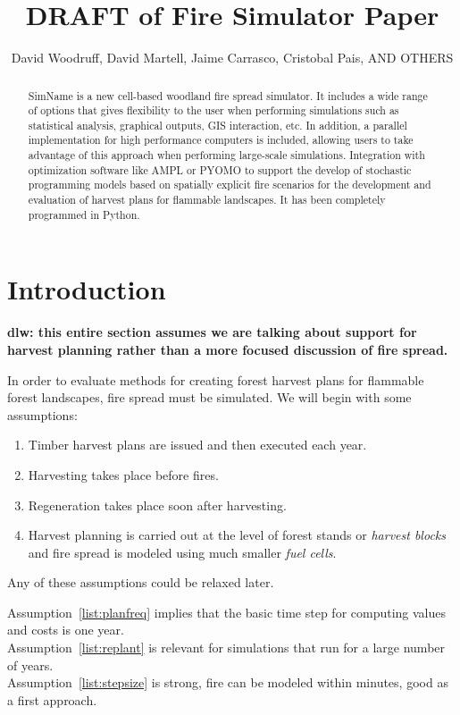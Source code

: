\documentclass[11pt]{article}
\title{DRAFT of Fire Simulator Paper}
\author{David Woodruff, David Martell, Jaime Carrasco, Cristobal Pais, AND OTHERS}
\begin{document}
\maketitle

\begin{abstract}
  SimName is a new cell-based woodland fire spread simulator. It includes a wide range of options that gives flexibility to the user when performing simulations such as statistical analysis, graphical outputs, GIS interaction, etc. In addition, a parallel implementation for high performance computers is included, allowing users to take advantage of this approach when performing large-scale simulations. Integration with optimization software like AMPL or PYOMO to support the develop
  of stochastic programming models based on spatially explicit
  fire scenarios for the development and evaluation of harvest plans for flammable landscapes. It has been completely programmed in Python.
\end{abstract}

\section{Introduction}

{\bf dlw: this entire section assumes we are talking about
  support for harvest planning rather than a more focused discussion of fire spread.}

In order to evaluate methods for creating forest harvest plans for flammable forest landscapes, fire spread must
be simulated.
We will begin with some assumptions:
\begin{enumerate}
	\item Timber harvest plans are issued and then executed each year. \label{list:planfreq}
	\item Harvesting takes place before fires.
	\item Regeneration takes place soon after harvesting. \label{list:replant}
	\item Harvest planning is carried out
          at the level of forest stands or {\em harvest blocks} and fire spread is modeled using much smaller {\em fuel cells}.
\end{enumerate}

Any of these assumptions could be relaxed later.

Assumption~\ref{list:planfreq} implies that the basic time
step for computing values and costs is one year. \\
Assumption~\ref{list:replant} is relevant for simulations that run for a large number of years.\\
Assumption~\ref{list:stepsize} is strong, fire can be modeled within minutes, good as a first approach.
\end{document}
